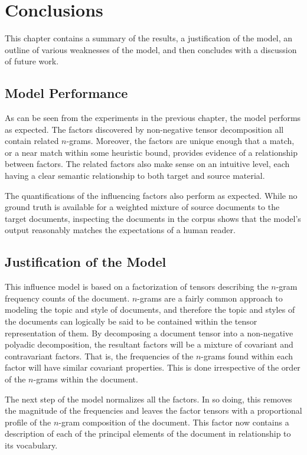 \documentclass[../ut-dissertation.tex]{subfiles}
\begin{document}
\chapter{Conclusions}
This chapter contains a summary of the results, a justification of the
model, an outline of various weaknesses of the model, and then
concludes with a discussion of future work.

\section{Model Performance}
As can be seen from the experiments in the previous chapter, the model
performs as expected.  The factors discovered by non-negative tensor
decomposition all contain related $n$-grams.  Moreover, the factors
are unique enough that a match, or a near match within some heuristic
bound, provides evidence of a relationship between factors.  The
related factors also make sense on an intuitive level, each having a
clear semantic relationship to both target and source material.

The quantifications of the influencing factors also perform as
expected.  While no ground truth is available for a weighted mixture
of source documents to the target documents, inspecting the documents
in the corpus shows that the model's output reasonably matches the
expectations of a human reader.


\section{Justification of the Model}
This influence model is based on a factorization of tensors describing
the $n$-gram frequency counts of the document.  $n$-grams are a fairly
common approach to modeling the topic and style of documents, and
therefore the topic and styles of the documents can logically be said
to be contained within the tensor representation of them.  By
decomposing a document tensor into a non-negative polyadic
decomposition, the resultant factors will be a mixture of covariant
and contravariant factors.  That is, the frequencies of the $n$-grams
found within each factor will have similar covariant properties.  This
is done irrespective of the order of the $n$-grams within the
document.

The next step of the model normalizes all the factors.  In so doing,
this removes the magnitude of the frequencies and leaves the factor
tensors with a proportional profile of the $n$-gram composition of the
document.  This factor now contains a description of each of the
principal elements of the document in relationship to its vocabulary.
\end{document}
